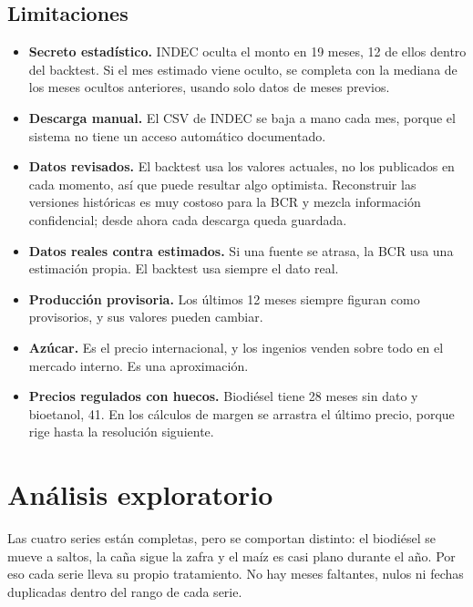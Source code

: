 \documentclass[11pt,a4paper]{article}
\begin{document}
\subsection{Limitaciones}

\begin{itemize}
  \item \textbf{Secreto estadístico.} INDEC oculta el monto en 19 meses, 12 de ellos dentro del backtest. Si el mes estimado viene oculto, se completa con la mediana de los meses ocultos anteriores, usando solo datos de meses previos.
  \item \textbf{Descarga manual.} El CSV de INDEC se baja a mano cada mes, porque el sistema no tiene un acceso automático documentado.
  \item \textbf{Datos revisados.} El backtest usa los valores actuales, no los publicados en cada momento, así que puede resultar algo optimista. Reconstruir las versiones históricas es muy costoso para la BCR y mezcla información confidencial; desde ahora cada descarga queda guardada.
  \item \textbf{Datos reales contra estimados.} Si una fuente se atrasa, la BCR usa una estimación propia. El backtest usa siempre el dato real.
  \item \textbf{Producción provisoria.} Los últimos 12 meses siempre figuran como provisorios, y sus valores pueden cambiar.
  \item \textbf{Azúcar.} Es el precio internacional, y los ingenios venden sobre todo en el mercado interno. Es una aproximación.
  \item \textbf{Precios regulados con huecos.} Biodiésel tiene 28 meses sin dato y bioetanol, 41. En los cálculos de margen se arrastra el último precio, porque rige hasta la resolución siguiente.
\end{itemize}

\section{Análisis exploratorio}

Las cuatro series están completas, pero se comportan distinto: el biodiésel se mueve a saltos, la caña sigue la zafra y el maíz es casi plano durante el año. Por eso cada serie lleva su propio tratamiento. No hay meses faltantes, nulos ni fechas duplicadas dentro del rango de cada serie.
\end{document}
